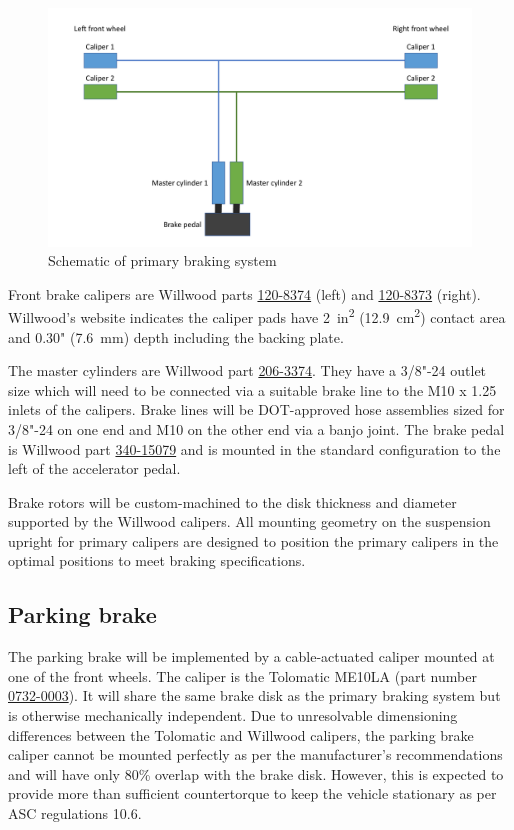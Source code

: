 \documentclass[10pt]{article}
\begin{document}
\begin{figure}
\centering
\includegraphics[width=\textwidth]{figures/primary-brakes-schematic}
\caption{Schematic of primary braking system}
\label{fig:primary-brakes-schematic}
\end{figure}

Front brake calipers are Willwood parts \href{http://www.wilwood.com/Calipers/CaliperProd.aspx?itemno=120-8374}{120-8374} (left) and \href{http://www.wilwood.com/Calipers/CaliperProd.aspx?itemno=120-8373}{120-8373} (right). Willwood's website indicates the caliper pads have \SI{2}{in\squared} (\SI{12.9}{\centi\metre\squared}) contact area and 0.30" (\SI{7.6}{\milli\metre}) depth including the backing plate.

The master cylinders are Willwood part \href{http://www.wilwood.com/MasterCylinders/MasterCylinderProd.aspx?itemno=260-3374}{206-3374}. They have a 3/8"-24 outlet size which will need to be connected via a suitable brake line to the M10 x 1.25 inlets of the calipers. Brake lines will be DOT-approved hose assemblies sized for 3/8"-24 on one end and M10 on the other end via a banjo joint. The brake pedal is Willwood part \href{http://www.wilwood.com/Pedals/PedalProd.aspx?itemno=340-15079}{340-15079} and is mounted in the standard configuration to the left of the accelerator pedal.

Brake rotors will be custom-machined to the disk thickness and diameter supported by the Willwood calipers. All mounting geometry on the suspension upright for primary calipers are designed to position the primary calipers in the optimal positions to meet braking specifications.

\subsection{Parking brake}
The parking brake will be implemented by a cable-actuated caliper mounted at one of the front wheels. The caliper is the Tolomatic ME10LA (part number \href{https://www.tolomatic.com/products/product-details/me10-mechanical-disc-brake#/specs-order}{0732-0003}). It will share the same brake disk as the primary braking system but is otherwise mechanically independent. Due to unresolvable dimensioning differences between the Tolomatic and Willwood calipers, the parking brake caliper cannot be mounted perfectly as per the manufacturer's recommendations and will have only 80\% overlap with the brake disk. However, this is expected to provide more than sufficient countertorque to keep the vehicle stationary as per ASC regulations 10.6.
\end{document}
